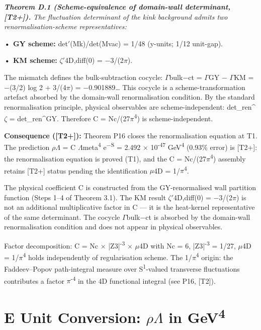 \documentclass[11pt,letterpaper]{article}
\begin{document}
\noindent \textbf{\textit{Theorem D.1 (Scheme-equivalence of domain-wall determinant, [T2+]). }}\textit{The fluctuation determinant of the kink background admits two renormalisation-scheme representatives:}

\noindent \textbf{• GY scheme: }det$'$(Mk)/det(Mvac) = 1/48 (y-units; 1/12 unit-gap).

\noindent \textbf{• KM scheme: }$\zeta$$'$4D,diff(0) = $-$3/(2$\pi$).

\noindent The mismatch defines the bulk-subtraction cocycle: $\Gamma$bulk$-$ct = $\Gamma$GY $-$ $\Gamma$KM = $-$(3/2) log 2 + 3/(4$\pi$) = $-$0.901889\ldots{} This cocycle is a scheme-transformation artefact absorbed by the domain-wall renormalisation condition. By the standard renormalisation principle, physical observables are scheme-independent: det\_ren\textasciicircum{}$\zeta$ = det\_ren\textasciicircum{}GY. Therefore C = Nc/(27$\pi$\textsuperscript{4}) is scheme-independent.

\noindent \textbf{Consequence ([T2+]): }Theorem P16 closes the renormalisation equation at T1. The prediction $\rho$$\Lambda$ = C $\Lambda$meta\textsuperscript{4} e\textsuperscript{$-$S} = 2.492 $\times$ 10\textsuperscript{-47} GeV\textsuperscript{4} (0.93\% error) is [T2+]: the renormalisation equation is proved (T1), and the C = Nc/(27$\pi$\textsuperscript{4}) assembly retains [T2+] status pending the identification $\mu$4D = 1/$\pi$\textsuperscript{4}.

\noindent The physical coefficient C is constructed from the GY-renormalised wall partition function (Steps 1--4 of Theorem 3.1). The KM result $\zeta$$'$4D,diff(0) = $-$3/(2$\pi$) is not an additional multiplicative factor in C --- it is the heat-kernel representative of the same determinant. The cocycle $\Gamma$bulk$-$ct is absorbed by the domain-wall renormalisation condition and does not appear in physical observables.

\noindent Factor decomposition: C = Nc $\times$ |Z3|\textsuperscript{-3} $\times$ $\mu$4D with Nc = 6, |Z3|\textsuperscript{-3} = 1/27, $\mu$4D = 1/$\pi$\textsuperscript{4} holds independently of regularisation scheme. The 1/$\pi$\textsuperscript{4} origin: the Faddeev--Popov path-integral measure over S\textsuperscript{1}-valued transverse fluctuations contributes a factor $\pi$\textsuperscript{-4} in the 4D functional integral (see P16, [T2]).

\section*{E  Unit Conversion: $\rho$$\Lambda$ in GeV\textsuperscript{4}}
\end{document}
